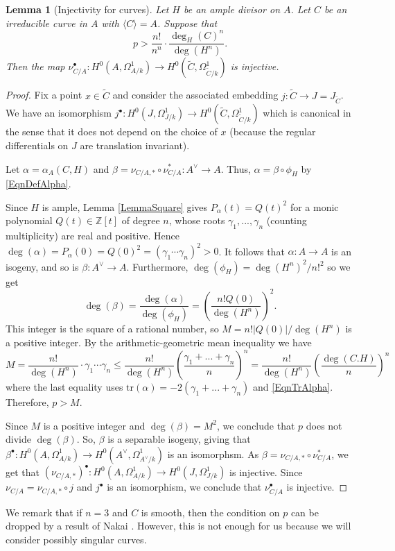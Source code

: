 \documentclass[11pt]{amsart}
\newtheorem{lemma}[theorem]{Lemma}
\theoremstyle{remark}
\numberwithin{equation}{section}
\newcommand{\Z}{\mathbb{Z}}
\newcommand{\tr}{\mathrm{tr}}
\begin{document}
\begin{lemma}[Injectivity for curves]\label{LemmaInjCurves} Let $H$ be an ample divisor on $A$. Let $C$ be an irreducible curve in $A$ with $\langle C\rangle =A$. Suppose that
$$
p>\frac{n!}{n^n}\cdot \frac{\deg_H(C)^n}{\deg(H^n)}.
$$  
Then the map $\nu_{C/A}^\bullet : H^0(A,\Omega^1_{A/k})\to H^0(\widetilde{C}, \Omega^1_{\widetilde{C}/k})$ is injective.
\end{lemma}
\begin{proof} Fix a point $x\in \widetilde{C}$ and consider the associated embedding $j: \widetilde{C}\to J=J_{\widetilde{C}}$. We have an isomorphism $j^\bullet : H^0(J,\Omega^1_{J/k})\to H^0(\widetilde{C}, \Omega^1_{\widetilde{C}/k})$ which is canonical in the sense that it does not depend on the choice of $x$ (because the regular differentials on $J$ are translation invariant).

Let $\alpha =\alpha_A(C,H)$ and $\beta = \nu_{C/A,*}\circ \nu_{C/A}^* : A^\vee \to A$. Thus, $\alpha=\beta\circ \phi_H$ by \eqref{EqnDefAlpha}. 

Since $H$ is ample, Lemma \ref{LemmaSquare} gives $P_\alpha(t)=Q(t)^2$ for a monic polynomial $Q(t)\in \Z[t]$ of degree $n$, whose roots $\gamma_1,...,\gamma_n$ (counting multiplicity) are real and positive. Hence $\deg(\alpha)=P_\alpha(0)=Q(0)^2=(\gamma_1\cdots \gamma_n)^2 >0$. It follows that $\alpha:A\to A$ is an isogeny, and so is $\beta: A^\vee\to A$. Furthermore, $\deg(\phi_H)=\deg(H^n)^2/n!^2$ so we get 
$$
\deg(\beta)=\frac{\deg(\alpha)}{\deg(\phi_H)}=\left(\frac{n! Q(0)}{\deg(H^n)}\right)^2.
$$
This integer is the square of a rational number, so $M=n! |Q(0)|/\deg(H^n)$ is a positive integer. By the arithmetic-geometric mean inequality we have
$$
M = \frac{n!}{\deg(H^n)}\cdot \gamma_1\cdots \gamma_n\le \frac{n!}{\deg(H^n)}\left(\frac{\gamma_1+...+ \gamma_n}{n}\right)^n = \frac{n!}{\deg(H^n)}\left(\frac{\deg(C.H)}{n}\right)^n
$$
where the last equality uses $\tr(\alpha)=-2(\gamma_1+... + \gamma_n)$ and \eqref{EqnTrAlpha}. Therefore, $p>M$.

Since $M$ is a positive integer and $\deg(\beta)=M^2$, we conclude that $p$ does not divide $\deg(\beta)$. So, $\beta$ is a separable isogeny, giving that $\beta^\bullet : H^0(A,\Omega^1_{A/k})\to H^0(A^\vee,\Omega^1_{A^\vee/k})$ is an isomorphsm. As $\beta = \nu_{C/A,*}\circ \nu_{C/A}^*$, we get that $(\nu_{C/A,*})^\bullet : H^0(A,\Omega^1_{A/k})\to H^0(J,\Omega^1_{J/k})$ is injective. Since $\nu_{C/A} = \nu_{C/A,*}\circ j$ and $j^\bullet$ is an isomorphism, we conclude that $\nu_{C/A}^\bullet$ is injective.
\end{proof}
We remark that if $n=3$ and $C$ is smooth, then the condition on $p$ can be dropped by a result of Nakai \cite{NakaiNotes}. However, this is not enough for us because we will consider possibly singular curves.
\end{document}
